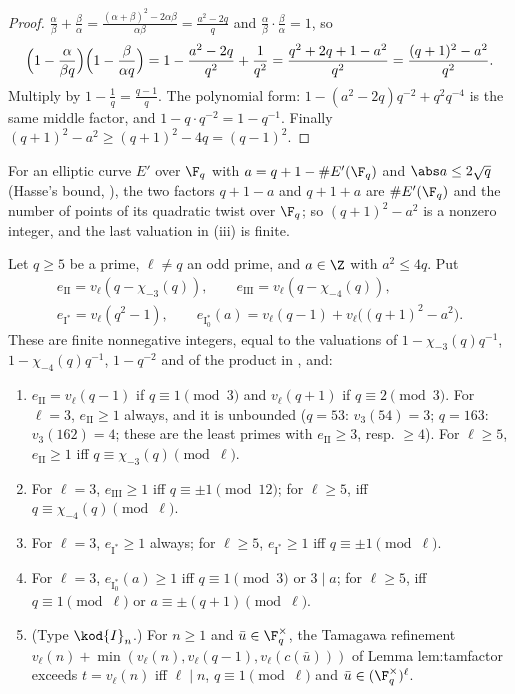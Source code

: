 \begin{proof}
$\frac\alpha\beta+\frac\beta\alpha=\frac{(\alpha+\beta)^2-2\alpha\beta}{\alpha\beta}=\frac{a^2-2q}q$ and $\frac\alpha\beta\cdot\frac\beta\alpha=1$, so
\[
\Bigl(1-\frac\alpha{\beta q}\Bigr)\Bigl(1-\frac\beta{\alpha q}\Bigr)=1-\frac{a^2-2q}{q^2}+\frac1{q^2}=\frac{q^2+2q+1-a^2}{q^2}=\frac{(q+1)^2-a^2}{q^2}.
\]
Multiply by $1-\frac1q=\frac{q-1}q$. The polynomial form: $1-(a^2-2q)q^{-2}+q^2q^{-4}$ is the same middle factor, and $1-q\cdot q^{-2}=1-q^{-1}$. Finally
$(q+1)^2-a^2\ge(q+1)^2-4q=(q-1)^2$.
\end{proof}

For an elliptic curve $E'$ over $\F_q$ with $a=q+1-\#E'(\F_q)$ and $\abs a\le2\sqrt q$ (Hasse's bound, ), the two factors $q+1-a$ and $q+1+a$
are $\#E'(\F_q)$ and the number of points of its quadratic twist over $\F_q$; so $(q+1)^2-a^2$ is a nonzero integer, and the last valuation in
(iii) is finite.

\begin{proposition}\label{prop:rings:local-terms}
Let $q\ge5$ be a prime, $\ell\ne q$ an odd prime, and $a\in\Z$ with $a^2\le4q$. Put
\begin{gather*}
e_{\mathrm{II}}=v_\ell(q-\chi_{-3}(q)),\qquad e_{\mathrm{III}}=v_\ell(q-\chi_{-4}(q)),\\
e_{\mathrm{I}^*}=v_\ell(q^2-1),\qquad e_{\mathrm{I}_0^*}(a)=v_\ell(q-1)+v_\ell\bigl((q+1)^2-a^2\bigr).
\end{gather*}
These are finite nonnegative integers, equal to the valuations of $1-\chi_{-3}(q)q^{-1}$, $1-\chi_{-4}(q)q^{-1}$, $1-q^{-2}$ and of the product in
, and:
\begin{enumerate}[label=(\roman*)]
\item $e_{\mathrm{II}}=v_\ell(q-1)$ if $q\equiv1\pmod3$ and $v_\ell(q+1)$ if $q\equiv2\pmod3$. For $\ell=3$, $e_{\mathrm{II}}\ge1$ always, and it is unbounded ($q=53$: $v_3(54)=3$;
$q=163$: $v_3(162)=4$; these are the least primes with $e_{\mathrm{II}}\ge3$, resp. $\ge4$). For $\ell\ge5$, $e_{\mathrm{II}}\ge1$ iff $q\equiv\chi_{-3}(q)\pmod\ell$.
\item For $\ell=3$, $e_{\mathrm{III}}\ge1$ iff $q\equiv\pm1\pmod{12}$; for $\ell\ge5$, iff $q\equiv\chi_{-4}(q)\pmod\ell$.
\item For $\ell=3$, $e_{\mathrm{I}^*}\ge1$ always; for $\ell\ge5$, $e_{\mathrm{I}^*}\ge1$ iff $q\equiv\pm1\pmod\ell$.
\item For $\ell=3$, $e_{\mathrm{I}_0^*}(a)\ge1$ iff $q\equiv1\pmod3$ or $3\mid a$; for $\ell\ge5$, iff $q\equiv1\pmod\ell$ or $a\equiv\pm(q+1)\pmod\ell$.
\item (Type $\kod{I}_n$.) For $n\ge1$ and $\bar u\in\F_q^\times$, the Tamagawa refinement $v_\ell(n)+\min(v_\ell(n),v_\ell(q-1),v_\ell(c(\bar u)))$ of Lemma lem:tamfactor exceeds
$t=v_\ell(n)$ iff $\ell\mid n$, $q\equiv1\pmod\ell$ and $\bar u\in(\F_q^\times)^\ell$.
\end{enumerate}
\end{proposition}

